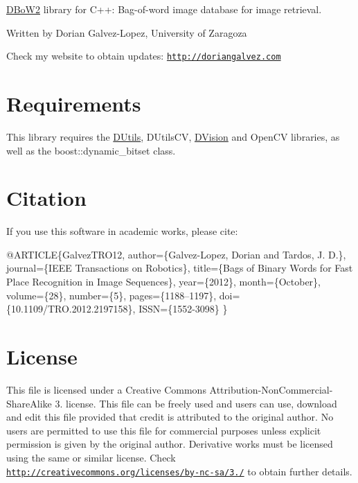 \hyperlink{namespaceDBoW2}{D\+Bo\+W2} library for C++\+: Bag-\/of-\/word image database for image retrieval.

Written by Dorian Galvez-\/\+Lopez, University of Zaragoza

Check my website to obtain updates\+: \href{http://doriangalvez.com}{\tt http\+://doriangalvez.\+com}\hypertarget{index_requirements}{}\section{Requirements}\label{index_requirements}
This library requires the \hyperlink{namespaceDUtils}{D\+Utils}, D\+Utils\+CV, \hyperlink{namespaceDVision}{D\+Vision} and Open\+CV libraries, as well as the boost\+::dynamic\+\_\+bitset class.\hypertarget{index_citation}{}\section{Citation}\label{index_citation}
If you use this software in academic works, please cite\+: 
\begin{DoxyPre}
  @ARTICLE\{GalvezTRO12,
   author=\{Galvez-Lopez, Dorian and Tardos, J. D.\}, 
   journal=\{IEEE Transactions on Robotics\},
   title=\{Bags of Binary Words for Fast Place Recognition in Image Sequences\},
   year=\{2012\},
   month=\{October\},
   volume=\{28\},
   number=\{5\},
   pages=\{1188--1197\},
   doi=\{10.1109/TRO.2012.2197158\},
   ISSN=\{1552-3098\}
 \}
\end{DoxyPre}
\hypertarget{index_license}{}\section{License}\label{index_license}
This file is licensed under a Creative Commons Attribution-\/\+Non\+Commercial-\/\+Share\+Alike 3. license. This file can be freely used and users can use, download and edit this file provided that credit is attributed to the original author. No users are permitted to use this file for commercial purposes unless explicit permission is given by the original author. Derivative works must be licensed using the same or similar license. Check \href{http://creativecommons.org/licenses/by-nc-sa/3.0/}{\tt http\+://creativecommons.\+org/licenses/by-\/nc-\/sa/3./} to obtain further details. 
